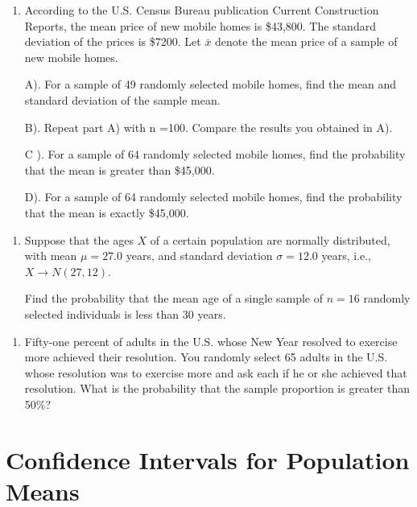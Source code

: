 \documentclass[
]{book}
\providecommand{\tightlist}{%
  \setlength{\itemsep}{0pt}\setlength{\parskip}{0pt}}
\begin{document}
\hfill\break

\begin{enumerate}
\def\labelenumi{\arabic{enumi}.}
\setcounter{enumi}{1}
\item
  According to the U.S. Census Bureau publication Current Construction Reports, the mean price of new mobile homes is \$43,800. The standard deviation of the prices is \$7200. Let \(\bar{x}\) denote the mean price of a sample of new mobile homes.

  A). For a sample of 49 randomly selected mobile homes, find the mean and standard deviation of the sample mean.

  B). Repeat part A) with n =100. Compare the results you obtained in A).

  C ). For a sample of 64 randomly selected mobile homes, find the probability that the mean is greater than \$45,000.

  D). For a sample of 64 randomly selected mobile homes, find the probability that the mean is exactly \$45,000.
\end{enumerate}

\hfill\break

\begin{enumerate}
\def\labelenumi{\arabic{enumi}.}
\setcounter{enumi}{2}
\item
  Suppose that the ages \(X\) of a certain population are normally distributed, with mean \(\mu = 27.0\) years, and standard deviation \(\sigma = 12.0\) years, i.e., \(X \to N(27,12)\).

  Find the probability that the mean age of a single sample of \(n = 16\) randomly selected individuals is less than 30 years.
\end{enumerate}

\hfill\break

\begin{enumerate}
\def\labelenumi{\arabic{enumi}.}
\setcounter{enumi}{3}
\tightlist
\item
  Fifty-one percent of adults in the U.S. whose New Year resolved to exercise more achieved their resolution. You randomly select 65 adults in the U.S. whose resolution was to exercise more and ask each if he or she achieved that resolution. What is the probability that the sample proportion is greater than 50\%?
\end{enumerate}

\hypertarget{confidence-intervals-for-population-means}{%
\chapter{Confidence Intervals for Population Means}\label{confidence-intervals-for-population-means}}
\end{document}
